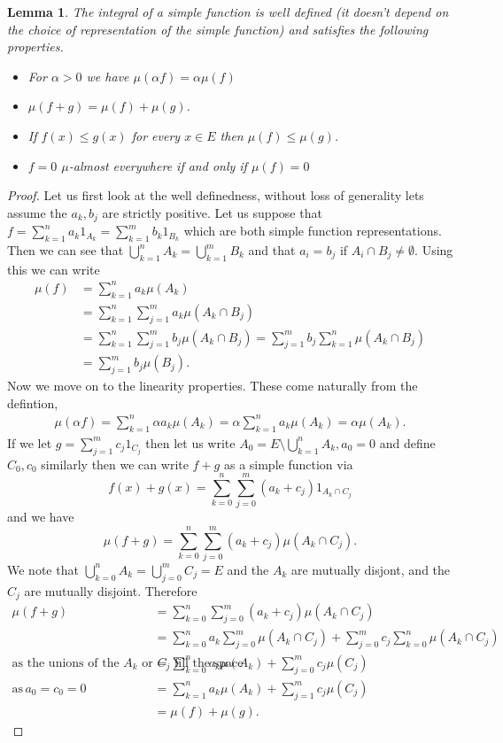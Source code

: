 \documentclass[11pt]{article}
\newtheorem{lem}[thm]{Lemma}
\theoremstyle{definition}
\theoremstyle{remark}
\begin{document}
\begin{lem}
The integral of a simple function is well defined (it doesn't depend on the choice of representation of the simple function) and satisfies the following properties.
\begin{itemize}
\item For $\alpha >0$ we have $\mu(\alpha f) = \alpha \mu(f)$
\item $\mu(f+g) = \mu(f) + \mu(g)$.
\item If $f(x) \leq g(x)$ for every $x \in E$ then $\mu(f) \leq \mu(g)$.
\item $f=0$ $\mu$-almost everywhere if and only if $\mu(f)=0$
\end{itemize}
\end{lem}
\begin{proof}
Let us first look at the well definedness, without loss of generality lets assume the $a_k, b_j$ are strictly positive. Let us suppose that $f = \sum_{k=1}^n a_k 1_{A_k} = \sum_{k=1}^m b_k 1_{B_k}$ which are both simple function representations. Then we can see that $\bigcup_{k=1}^nA_k = \bigcup_{k=1}^m B_k$ and that $a_i =b_j$ if $A_i \cap B_j \neq \emptyset$. Using this we can write
\begin{align*} 
\mu(f) &= \sum_{k=1}^n a_k \mu(A_k)\\
&= \sum_{k=1}^n \sum_{j=1}^m a_k \mu(A_k \cap B_j) \\
& = \sum_{k=1}^n \sum_{j=1}^m b_j \mu(A_k \cap B_j) = \sum_{j=1}^m b_j \sum_{k=1}^n \mu(A_k \cap B_j) \\
&= \sum_{j=1}^m b_j \mu(B_j).
\end{align*}
Now we move on to the linearity properties. These come naturally from the defintion,
\begin{align*}
\mu(\alpha f) = \sum_{k=1}^n \alpha a_k \mu(A_k) = \alpha \sum_{k=1}^n a_k \mu(A_k) = \alpha \mu(A_k).
\end{align*}
If we let $g = \sum_{j=1}^m c_j 1_{C_j}$ then let us write $A_0 = E \setminus \bigcup_{k=1}^n A_k, a_0 =0$ and define $C_0, c_0$ similarly then we can write $f+g$ as a simple function via
\[f(x) + g(x) = \sum_{k=0}^n \sum_{j=0}^m (a_k + c_j) 1_{A_k \cap C_j}\] and we have
\[ \mu(f+g) = \sum_{k=0}^n \sum_{j=0}^m (a_k +c_j) \mu(A_k \cap C_j). \] We note that $\bigcup_{k=0}^n A_k = \bigcup_{j=0}^m C_j = E$ and the $A_k$ are mutually disjont, and the $C_j$ are mutually disjoint. Therefore
\begin{align*}
\mu(f+g) &= \sum_{k=0}^n \sum_{j=0}^m (a_k +c_j) \mu(A_k \cap C_j)\\
&= \sum_{k=0}^n a_k \sum_{j=0}^m \mu(A_k \cap C_j) + \sum_{j=0}^m c_j \sum_{k=0}^n \mu(A_k \cap C_j) \\
\mbox{as the unions of the $A_k$ or $C_j$ fill the space} \quad & = \sum_{k=0}^n a_k \mu(A_k) + \sum_{j=0}^m c_j \mu(C_j)\\
\mbox{as}\, a_0 = c_0 =0 \quad & = \sum_{k=1}^n a_k \mu(A_k) + \sum_{j=1}^m c_j \mu(C_j) \\
& = \mu(f) + \mu(g).
\end{align*}


\end{proof}
\end{document}
